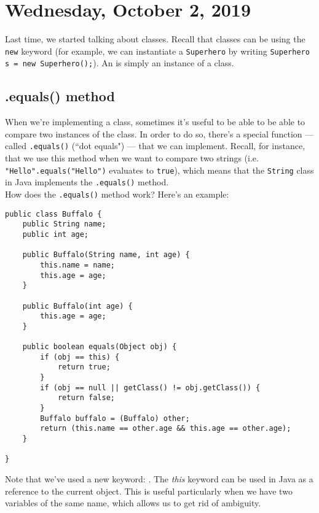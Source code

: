 \section{Wednesday, October 2, 2019}

Last time, we started talking about classes. Recall that classes can be  using the \verb!new! keyword (for example, we can instantiate a \verb!Superhero! by writing \verb!Superhero s = new Superhero();!). An  is simply an instance of a class.

\subsection{.equals() method}

When we're implementing a class, sometimes it's useful to be able to be able to compare two instances of the class. In order to do so, there's a special function --- called \verb!.equals()! (``dot equals") --- that we can implement. Recall, for instance, that we use this method when we want to compare two strings (i.e. \verb!"Hello".equals("Hello")! evaluates to \verb!true!), which means that the \verb!String! class in Java implements the \verb!.equals()! method. \\

How does the \verb!.equals()! method work? Here's an example:

\begin{lstlisting}
public class Buffalo {
    public String name;
    public int age;
    
    public Buffalo(String name, int age) {
        this.name = name;
        this.age = age;
    }
    
    public Buffalo(int age) {
        this.age = age;
    }
    
    public boolean equals(Object obj) {
        if (obj == this) {
            return true;
        }
        if (obj == null || getClass() != obj.getClass()) {
            return false;
        }
        Buffalo buffalo = (Buffalo) other;
        return (this.name == other.age && this.age == other.age);
    }
    
}
\end{lstlisting}

Note that we've used a new keyword: . The \textit{this} keyword can be used in Java as a reference to the current object. This is useful particularly when we have two variables of the same name, which allows us to get rid of ambiguity. \\

